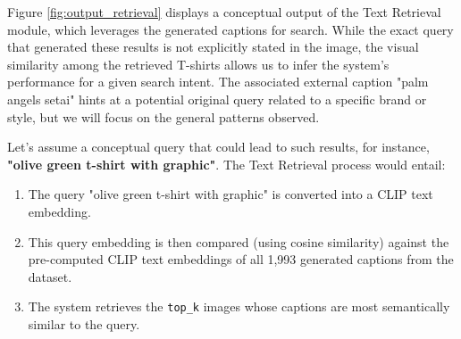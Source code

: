 \documentclass{article}
\begin{document}
Figure \ref{fig:output_retrieval} displays a conceptual output of the Text Retrieval module, which leverages the generated captions for search. While the exact query that generated these results is not explicitly stated in the image, the visual similarity among the retrieved T-shirts allows us to infer the system's performance for a given search intent. The associated external caption "palm angels setai" hints at a potential original query related to a specific brand or style, but we will focus on the general patterns observed.

Let's assume a conceptual query that could lead to such results, for instance, \textbf{"olive green t-shirt with graphic"}.
The Text Retrieval process would entail:
\begin{enumerate}
    \item The query "olive green t-shirt with graphic" is converted into a CLIP text embedding.
    \item This query embedding is then compared (using cosine similarity) against the pre-computed CLIP text embeddings of all 1,993 generated captions from the dataset.
    \item The system retrieves the \texttt{top\_k} images whose captions are most semantically similar to the query.
\end{enumerate}
\end{document}
